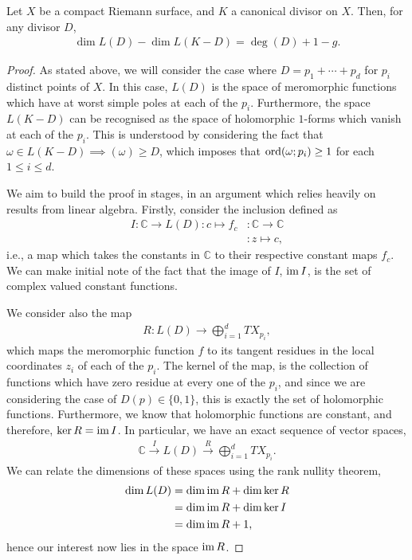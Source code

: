 \begin{theorem}
	Let $ X $ be a compact Riemann surface, and $ K $ a canonical divisor on $ X $.
	Then, for any divisor $ D $,
	\begin{align*}
		\dim L(D) - \dim L(K-D) = \deg(D) + 1 - g.
	\end{align*}
	\begin{proof}
		As stated above, we will consider the case where $ D = p_{1}+ \cdots + p_{d}
		$ for $ p_{i} $ distinct points of $ X $. In this case, $ L(D) $ is the
		space of meromorphic functions which have at worst simple poles at each of
		the $ p_{i} $. Furthermore, the space $ L(K-D) $ can be recognised as the
		space of holomorphic $ 1 $-forms which vanish at each of the $ p_{i} $. This
		is understood by considering the fact that $ \omega \in L ( K-D ) \implies (
			\omega ) \geq D $, which imposes that $ \operatorname{ord} ( \omega;p_{i} ) \geq 1 $ for
		each $ 1 \leq i \leq d $.

		We aim to build the proof in stages, in an argument which relies heavily on
		results from linear algebra. Firstly, consider the inclusion defined as
		\begin{align*}
			I:\mathbb{C}\to L ( D ):c \mapsto f_{c} & : \mathbb{C}\to \mathbb{C} \\
			                                        & : z \mapsto c,
		\end{align*}
		i.e., a map which takes the constants in $ \mathbb{C} $ to their respective
		constant maps $ f_{c} $. We can make initial note of the fact that the image
		of $ I $, $ \operatorname{im} I $, is the set of complex valued constant functions.

		We consider also the map
		\begin{align*}
			R: L(D) \to \bigoplus_{i=1}^{d}{TX_{p_{i}}},
		\end{align*}
		which maps the meromorphic function $ f $ to its tangent residues in the
		local coordinates $ z_{i} $ of each of the $ p_{i} $. The kernel of the map,
		is the collection of functions which have zero residue at every one of the
		$ p_{i} $, and since we are considering the case of $ D(p) \in \{ 0,1 \} $,
		this is exactly the set of holomorphic functions. Furthermore, we know that
		holomorphic functions are constant, and therefore, $ \ker R = \operatorname{im} I $. In
		particular, we have an exact sequence of vector spaces,
		\begin{align*}
			\mathbb{C}\xrightarrow{\ I\ } L(D)\xrightarrow{\ R\ }
			\bigoplus_{i=1}^{d}{TX_{p_{i}}}.
		\end{align*}
		We can relate the dimensions of these spaces using the rank nullity theorem,
		\begin{align*}
			\dim L(D) & = \dim\operatorname{im} R + \dim\ker R \\
			          & = \dim\operatorname{im} R + \dim\ker I \\
			          & = \dim\operatorname{im} R + 1,
		\end{align*}
		hence our interest now lies in the space $ \operatorname{im} R $.


\end{proof}
\end{theorem}
